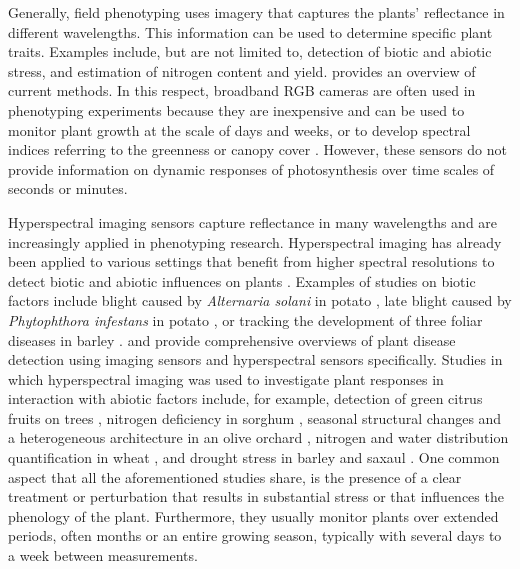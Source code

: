 \documentclass[10pt,authoryear,a4paper]{elsarticle}
\begin{document}
    Generally, field phenotyping uses imagery that captures the plants' reflectance in different wavelengths. This information can be used to determine specific plant traits. Examples include, but are not limited to, detection of biotic and abiotic stress, and estimation of nitrogen content and yield. \citet{mirHighthroughput2019} provides an overview of current methods. In this respect, broadband RGB cameras are often used in phenotyping experiments because they are inexpensive and can be used to monitor plant growth at the scale of days and weeks, or to develop spectral indices referring to the greenness or canopy cover \citep{borra-serranoClosing2020}. However, these sensors do not provide information on dynamic responses of photosynthesis over time scales of seconds or minutes.
    
    Hyperspectral imaging sensors capture reflectance in many wavelengths and are increasingly applied in phenotyping research. Hyperspectral imaging has already been applied to various settings that benefit from higher spectral resolutions to detect biotic and abiotic influences on plants \citep{khanModern2018}. Examples of studies on biotic factors include blight caused by \textit{Alternaria solani} in potato \citep{vandevijverInfield2020}, late blight caused by \textit{Phytophthora infestans} in potato \citep{franceschiniFeasibility2019}, or tracking the development of three foliar diseases in barley \citep{wahabzadaPlant2016}. \citet{mahleinPlant2015} and \citet{loweHyperspectral2017} provide comprehensive overviews of plant disease detection using imaging sensors and hyperspectral sensors specifically. Studies in which hyperspectral imaging was used to investigate plant responses in interaction with abiotic factors include, for example, detection of green citrus fruits on trees \citep{okamotoGreen2009}, nitrogen deficiency in sorghum \citep{zhaoNitrogen2005}, seasonal structural changes and a heterogeneous architecture in an olive orchard \citep{zarco-tejadaSpatiotemporal2013}, nitrogen and water distribution quantification in wheat \citep{bruningDevelopment2019}, and drought stress in barley and saxaul \citep{behmannDetection2014,jinHyperspectral2016}. One common aspect that all the aforementioned studies share, is the presence of a clear treatment or perturbation that results in substantial stress or that influences the phenology of the plant. Furthermore, they usually monitor plants over extended periods, often months or an entire growing season, typically with several days to a week between measurements. 
    
\end{document}
